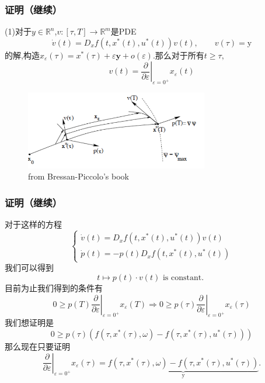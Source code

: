 \documentclass[UTF8, aspectratio=169, 9pt]{ctexbeamer}
\begin{document}
\begin{frame}
\frametitle{证明（继续） }

(1)对于$y \in \mathbb{R}^n$,$v:[\tau, T] \to \mathbb{R}^m$是PDE
$$
\dot{v}(t)=D_{x} f\left(t, x^{*}(t), u^{*}(t)\right) v(t), \qquad v(\tau)=\mathrm{y}
$$
的解,构造$x_{\varepsilon}(\tau)=x^{*}(\tau)+\varepsilon \mathbf{y}+o(\varepsilon)$.那么对于所有$t \ge \tau , $
$$
v(t)=\left.\frac{\partial}{\partial \varepsilon}\right|_{\varepsilon=0^{+}} x_{\varepsilon}(t)
$$

\begin{figure}
  \centering
  \includegraphics[width=8cm]{variationalequation.png}
  \caption{from Bressan-Piccolo's book}
\end{figure}
\end{frame}

\begin{frame}
\frametitle{证明（继续） }
对于这样的方程
$$
\left\{\begin{array}{l}
\dot{v}(t)=D_{x} f\left(t, x^{*}(t), u^{*}(t)\right) v(t) \\
\dot{p}(t)=-p(t) D_{x} f\left(t, x^{*}(t), u^{*}(t)\right)
\end{array}\right.
$$
我们可以得到
$$
t \mapsto p(t) \cdot v(t) \text { is constant. }
$$
目前为止我们得到的条件有
$$
0 \geq\left. p(T) \frac{\partial}{\partial \varepsilon}\right|_{\varepsilon=0^{+}} x_{\varepsilon}(T)
\Rightarrow 
0 \geq\left. p(\tau) \frac{\partial}{\partial \varepsilon}\right|_{\varepsilon=0^{+}} x_{\varepsilon}(\tau)
$$
我们想证明是
$$
0 \geq p(\tau)\left(f\left(\tau, x^{*}(\tau), \omega\right)-f\left(\tau, x^{*}(\tau), u^{*}(\tau)\right)\right)
$$
那么现在只要证明
$$
\left.\frac{\partial}{\partial \varepsilon}\right|_{\varepsilon=0^{+}} x_{\varepsilon}(\tau)=\underbrace{f\left(\tau, x^{*}(\tau), \omega\right)-f\left(\tau, x^{*}(\tau), u^{*}(\tau)\right)}_{\mathrm{y}}.
$$
\end{frame}
\end{document}
